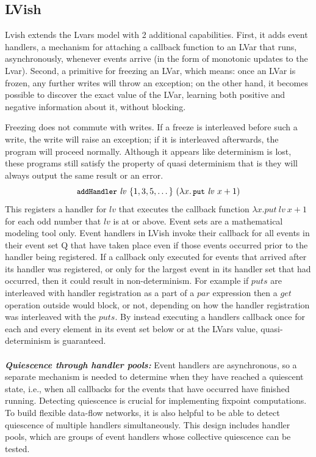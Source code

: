 \documentclass[twocolumn]{article}
\newcommand\termfont[1]{\mbox{\small{\texttt{#1}}}}
\newcommand{\lam}[2]{\ensuremath{\lambda#1.\,#2}}
\newcommand{\PUT}{\termfont{put}}
\newcommand{\putexp}[2]{\ensuremath{\PUT~#1~#2}}
\newcommand{\ADDHANDLER}{{\termfont{addHandler}}}
\begin{document}
\subsection{LVish}
Lvish\cite{lkuper2} extends the Lvars model with 2 additional capabilities. First, it adds event handlers, a mechanism for attaching a callback function to an LVar that runs, asynchronously, whenever events arrive (in the form of monotonic updates to the Lvar). Second, a primitive for freezing an LVar, which means: once an LVar is frozen, any further writes will throw an exception; on the other hand, it becomes possible to discover the exact value of the LVar, learning both positive and negative information about it, without blocking.\par
Freezing does not commute with writes. If a freeze is interleaved before such a write, the write will raise an exception; if it is interleaved afterwards, the program will proceed normally. Although it appears like determinism is lost, these programs still satisfy the property of quasi determinism that is they will always output the same result or an error.
\vspace{-8mm}
\singlespacing
\begin{equation}
\ADDHANDLER~\mathit{lv}~\{ 1, 3, 5, \dots \}~(\lam{x}{\putexp{\mathit{lv}}{x+1}})
\label{e:lvish-example-1}
\end{equation}
This registers a handler for $lv$ that executes the callback function $\lambda{x}.put\ lv\ x + 1$ for each odd number that $lv$ is at or above. Event sets are a mathematical modeling tool only. Event handlers in LVish invoke their callback for all events in their event set Q that have taken place even if those events occurred prior to the handler being registered. If a callback only executed for events that arrived after its handler was registered, or only for the largest event in its handler set that had occurred, then it could result in non-determinism. For example if $puts$ are interleaved with handler registration as a part of a $par$ expression then a $get$ operation outside would block, or not, depending on how the handler registration was interleaved with the $puts$. By instead executing a handlers callback once for each and every element in its event set below or at the LVars value, quasi-determinism is guaranteed. \\ \\
\textbf{\textit{Quiescence through handler pools:}} Event handlers are asynchronous, so a separate mechanism is needed to determine when they have reached a quiescent state, i.e., when all callbacks for the events that have occurred have finished running. Detecting quiescence is crucial for implementing fixpoint computations. To build flexible data-flow networks, it is also helpful to be able to detect quiescence of multiple handlers simultaneously. This design includes handler pools, which are groups of event handlers whose collective quiescence can be tested.
\end{document}
